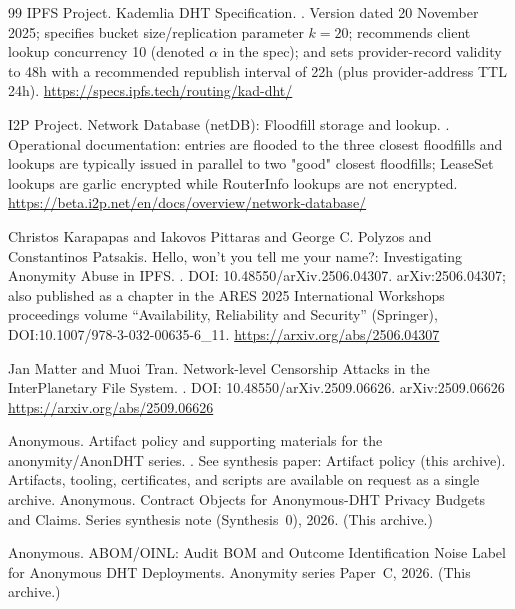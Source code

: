 \documentclass[11pt]{article}
\begin{document}
\begin{thebibliography}{99}
{IPFS Project}.
 {K}ademlia {DHT} Specification.
.
\newblock Version dated 20 November 2025; specifies bucket size/replication parameter $k=20$; recommends client lookup concurrency 10 (denoted $\alpha$ in the spec); and sets provider-record validity to 48h with a recommended republish interval of 22h (plus provider-address TTL 24h).
\newblock \url{https://specs.ipfs.tech/routing/kad-dht/}

{I2P Project}.
\newblock Network Database (netDB): Floodfill storage and lookup.
.
\newblock Operational documentation: entries are flooded to the three closest floodfills and lookups are typically issued in parallel to two "good" closest floodfills; LeaseSet lookups are garlic encrypted while RouterInfo lookups are not encrypted.
\newblock \url{https://beta.i2p.net/en/docs/overview/network-database/}

Christos Karapapas and Iakovos Pittaras and George C. Polyzos and Constantinos Patsakis.
\newblock Hello, won't you tell me your name?: Investigating Anonymity Abuse in {IPFS}.
.
\newblock DOI: 10.48550/arXiv.2506.04307.
\newblock arXiv:2506.04307; also published as a chapter in the ARES 2025 International Workshops proceedings volume ``Availability, Reliability and Security'' (Springer), DOI:10.1007/978-3-032-00635-6\_11.
\newblock \url{https://arxiv.org/abs/2506.04307}

Jan Matter and Muoi Tran.
\newblock Network-level Censorship Attacks in the {I}nter{P}lanetary {F}ile {S}ystem.
.
\newblock DOI: 10.48550/arXiv.2509.06626.
\newblock arXiv:2509.06626
\newblock \url{https://arxiv.org/abs/2509.06626}

Anonymous.
\newblock Artifact policy and supporting materials for the anonymity/AnonDHT series.
.
\newblock See synthesis paper: Artifact policy (this archive). Artifacts, tooling, certificates, and scripts are available on request as a single archive.
Anonymous.
\newblock Contract Objects for Anonymous-DHT Privacy Budgets and Claims.
\newblock Series synthesis note (Synthesis~0), 2026. (This archive.)

Anonymous.
\newblock ABOM/OINL: Audit BOM and Outcome Identification Noise Label for Anonymous DHT Deployments.
\newblock Anonymity series Paper~C, 2026. (This archive.)


\end{thebibliography}
\end{document}

